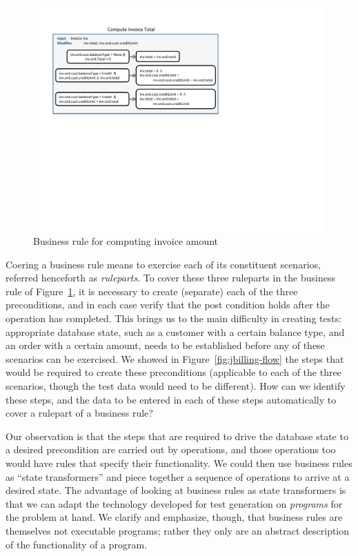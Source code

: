 \begin{figure}
\centering
\includegraphics[trim=30 300 270 0,clip,width=\columnwidth]{figs/invoice}
\caption{Business rule for computing invoice amount}
\label{fig:invoice}
\end{figure}

Coering a business rule means to exercise each of its constituent scenarios, referred henceforth as \textit{ruleparts}.
To cover these three ruleparts in the business rule of Figure~\ref{fig:invoice}, it is necessary to create (separate)
each of the three preconditions, and in each case verify that the post condition holds after the operation has completed.  
This brings us to the main difficulty in creating tests:  appropriate database state, such as a customer with a certain 
balance type, and an order with a certain amount, needs to be established before any of these scenarios can be exercised.  
We showed in Figure~\ref{fig:jbilling-flow} the steps that would be required to create these preconditions 
(applicable to each of the three scenarios, though the test data would need to be different).   How can we
identify these steps, and the data to be entered in each of these steps automatically to cover a rulepart of
a business rule?

Our observation is that the steps that are required to drive the database state to a desired precondition are
carried out by operations, and those operations too would have rules that specify their functionality.  We could
then use business rules as ``state transformers'' and piece together a sequence of operations to arrive at
a desired state.  The advantage of looking at business rules as state transformers is that we can adapt the
technology developed for test generation on \textit{programs} for the problem at hand.  We clarify and emphasize, 
though, that business rules are themselves not executable programs; rather they only are an abstract description 
of the functionality of a program.

